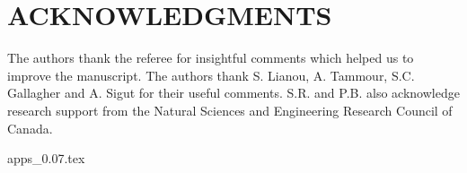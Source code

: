 \documentclass[useAMS,usenatbib]{mn2e}
\begin{document}
\section*{ACKNOWLEDGMENTS}
The authors thank the referee for insightful comments which helped us to improve the manuscript.
The authors thank S. Lianou, A. Tammour, S.C. Gallagher and A. Sigut for their useful comments. 
S.R. and P.B. also acknowledge research support from the Natural Sciences and Engineering Research Council of Canada. 



{apps_0.07.tex}
\end{document}
